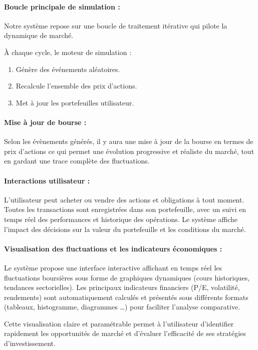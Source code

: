 \paragraph{Boucle principale de simulation :}
Notre système repose sur une boucle de traitement itérative qui pilote la
dynamique de marché.

À chaque cycle, le moteur de simulation :
\begin{enumerate}
    \item Génère des événements aléatoires.
\item Recalcule l'ensemble des prix d’actions.
\item Met à jour les portefeuilles utilisateur.
\end{enumerate}

\paragraph{Mise à jour de bourse :} Selon les évènements générés, il y aura une mise à jour de la bourse en termes de
prix d’actions ce qui permet une évolution progressive et réaliste du marché, tout
en gardant une trace complète des fluctuations.

\paragraph{Interactions utilisateur :}L'utilisateur peut acheter ou vendre des actions et obligations à tout moment.
Toutes les transactions sont enregistrées dans son portefeuille, avec un suivi en
temps réel des performances et historique des opérations. Le système affiche
l'impact des décisions sur la valeur du portefeuille et les conditions du marché.

\paragraph{Visualisation des fluctuations et les indicateurs
économiques :} Le système propose une interface interactive affichant en temps réel les
fluctuations boursières sous forme de graphiques dynamiques (cours
historiques, tendances sectorielles). Les principaux indicateurs financiers (P/E,
volatilité, rendements) sont automatiquement calculés et présentés sous
différents formats (tableaux, histogramme, diagrammes …) pour faciliter
l'analyse comparative.

Cette visualisation claire et paramétrable permet à
l'utilisateur d'identifier rapidement les opportunités de marché et d'évaluer
l'efficacité de ses stratégies d'investissement.



